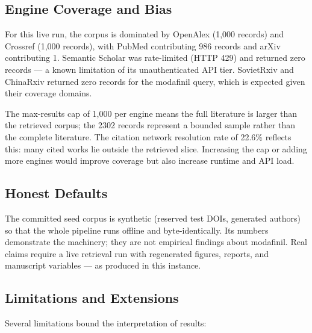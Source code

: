 \documentclass[
  english,
]{article}
\begin{document}
\subsection{Engine Coverage and Bias}\label{engine-coverage-and-bias}

For this live run, the corpus is dominated by OpenAlex (1,000 records)
and Crossref (1,000 records), with PubMed contributing 986 records and
arXiv contributing 1. Semantic Scholar was rate-limited (HTTP 429) and
returned zero records --- a known limitation of its unauthenticated API
tier. SovietRxiv and ChinaRxiv returned zero records for the modafinil
query, which is expected given their coverage domains.

The max-results cap of 1,000 per engine means the full literature is
larger than the retrieved corpus; the 2302 records represent a bounded
sample rather than the complete literature. The citation network
resolution rate of 22.6\% reflects this: many cited works lie outside
the retrieved slice. Increasing the cap or adding more engines would
improve coverage but also increase runtime and API load.

\subsection{Honest Defaults}\label{honest-defaults}

The committed seed corpus is synthetic (reserved test DOIs, generated
authors) so that the whole pipeline runs offline and byte-identically.
Its numbers demonstrate the machinery; they are not empirical findings
about modafinil. Real claims require a live retrieval run with
regenerated figures, reports, and manuscript variables --- as produced
in this instance.

\subsection{Limitations and
Extensions}\label{limitations-and-extensions}

Several limitations bound the interpretation of results:
\end{document}
